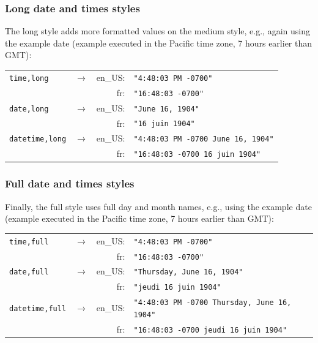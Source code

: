 \subsubsection{Long date and times styles}

The long style adds more formatted values on the medium style, e.g., again
using the example date (example executed in the Pacific time zone, 7 hours
earlier than GMT):

\begin{center}
\begin{tabular}{llrl}
\verb|time,long| & $\rightarrow$ &
                        en\_US: & \verb|"4:48:03 PM -0700"|\\
                     & & fr: & \verb|"16:48:03 -0700"|\\
\verb|date,long| & $\rightarrow$ &
                        en\_US: & \verb|"June 16, 1904"|\\
                     & & fr: & \verb|"16 juin 1904"|\\
\verb|datetime,long| & $\rightarrow$ &
                        en\_US: & \verb|"4:48:03 PM -0700 June 16, 1904"|\\
                     & & fr: & \verb|"16:48:03 -0700 16 juin 1904"|
\end{tabular}
\end{center}

\subsubsection{Full date and times styles}

Finally, the full style uses full day and month names, e.g.,
using the example date (example executed in the Pacific time zone, 7 hours
earlier than GMT):

\begin{center}
\begin{tabular}{llrl}
\verb|time,full| & $\rightarrow$ &
                        en\_US: & \verb|"4:48:03 PM -0700"|\\
                     & & fr: & \verb|"16:48:03 -0700"|\\
\verb|date,full| & $\rightarrow$ &
                        en\_US: & \verb|"Thursday, June 16, 1904"|\\
                     & & fr: & \verb|"jeudi 16 juin 1904"|\\
\verb|datetime,full| & $\rightarrow$ &
                        en\_US: & \verb|"4:48:03 PM -0700 Thursday, June 16, 1904"|\\
                     & & fr: & \verb|"16:48:03 -0700 jeudi 16 juin 1904"|
\end{tabular}
\end{center}

